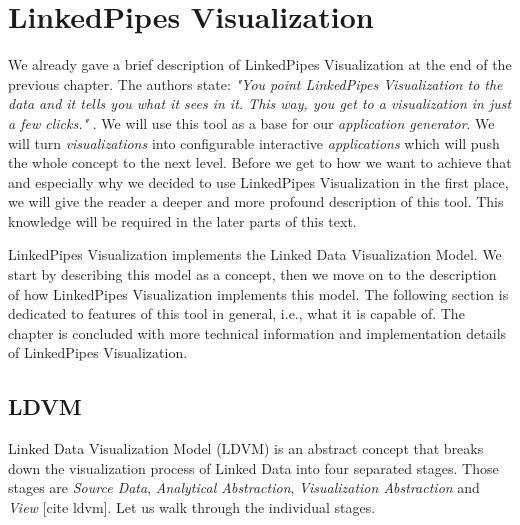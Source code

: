 \chapter{LinkedPipes Visualization}
\label{chap:linkedpipes-visualization}

We already gave a brief description of LinkedPipes Visualization \cite{linked_pipes_visualization} at the end of the previous chapter. The authors state: \emph{"You point LinkedPipes Visualization to the data and it tells you what it sees in it. This way, you get to a visualization in just a few clicks."}  \cite{linked_pipes_visualization}. We will use this tool as a base for our \emph{application generator}. We will turn \emph{visualizations} into configurable interactive \emph{applications} which will push the whole concept to the next level. Before we get to how we want to achieve that and especially why we decided to use LinkedPipes Visualization in the first place, we will give the reader a deeper and more profound description of this tool. This knowledge will be required in the later parts of this text.

LinkedPipes Visualization implements the Linked Data Visualization Model. We start by describing this model as a concept, then we move on to the description of how LinkedPipes Visualization implements this model. The following section is dedicated to features of this tool in general, i.e., what it is capable of. The chapter is concluded with more technical information and implementation details of LinkedPipes Visualization.

\section{LDVM}

Linked Data Visualization Model (LDVM) \cite{ldvm} is an abstract concept that breaks down the visualization process of Linked Data into four separated stages. Those stages are \emph{Source Data}, \emph{Analytical Abstraction}, \emph{Visualization Abstraction} and \emph{View} [cite ldvm]. Let us walk through the individual stages.

